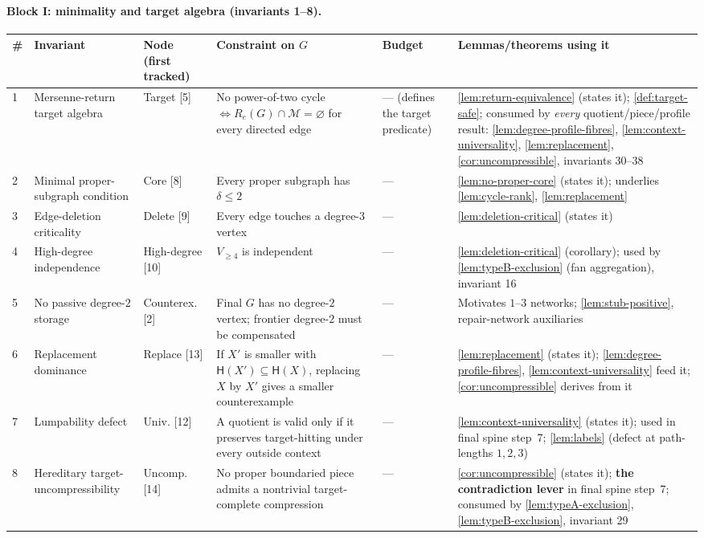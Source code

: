 \documentclass[11pt]{article}
\newcommand{\Mers}{\mathcal M}
\newcommand{\profile}{\mathsf H}
\begin{document}
\paragraph{Block I: minimality and target algebra (invariants 1--8).}
{\scriptsize\setlength{\tabcolsep}{3pt}
\begin{longtable}{C{0.022\textwidth} L{0.135\textwidth} L{0.115\textwidth} L{0.235\textwidth} L{0.085\textwidth} L{0.29\textwidth}}
\toprule
\textbf{\#} & \textbf{Invariant} & \textbf{Node (first tracked)} & \textbf{Constraint on $G$} & \textbf{Budget} & \textbf{Lemmas/theorems using it} \\
\midrule
{} & Mersenne-return target algebra & Target {[5]} & No power-of-two cycle $\iff R_e(G)\cap\Mers=\varnothing$ for every directed edge & --- (defines the target predicate) & \cref{lem:return-equivalence} (states it); \cref{def:target-safe}; consumed by \emph{every} quotient/piece/profile result: \cref{lem:degree-profile-fibres}, \cref{lem:context-universality}, \cref{lem:replacement}, \cref{cor:uncompressible}, invariants 30--38 \\
2 & Minimal proper-subgraph condition & Core {[8]} & Every proper subgraph has $\delta\le2$ & --- & \cref{lem:no-proper-core} (states it); underlies \cref{lem:cycle-rank}, \cref{lem:replacement} \\
3 & Edge-deletion criticality & Delete {[9]} & Every edge touches a degree-$3$ vertex & --- & \cref{lem:deletion-critical} (states it) \\
4 & High-degree independence & High-degree {[10]} & $V_{\ge4}$ is independent & --- & \cref{lem:deletion-critical} (corollary); used by \cref{lem:typeB-exclusion} (fan aggregation), invariant 16 \\
5 & No passive degree-$2$ storage & Counterex. {[2]} & Final $G$ has no degree-$2$ vertex; frontier degree-$2$ must be compensated & --- & Motivates $1$--$3$ networks; \cref{lem:stub-positive}, repair-network auxiliaries \\
6 & Replacement dominance & Replace {[13]} & If $X'$ is smaller with $\profile(X')\subseteq\profile(X)$, replacing $X$ by $X'$ gives a smaller counterexample & --- & \cref{lem:replacement} (states it); \cref{lem:degree-profile-fibres}, \cref{lem:context-universality} feed it; \cref{cor:uncompressible} derives from it \\
7 & Lumpability defect & Univ. {[12]} & A quotient is valid only if it preserves target-hitting under every outside context & --- & \cref{lem:context-universality} (states it); used in final spine step~7; \cref{lem:labels} (defect at path-lengths $1,2,3$) \\
8 & Hereditary target-uncompressibility & Uncomp. {[14]} & No proper boundaried piece admits a nontrivial target-complete compression & --- & \cref{cor:uncompressible} (states it); \textbf{the contradiction lever} in final spine step~7; consumed by \cref{lem:typeA-exclusion}, \cref{lem:typeB-exclusion}, invariant 29 \\
\bottomrule
\end{longtable}
}
\end{document}

